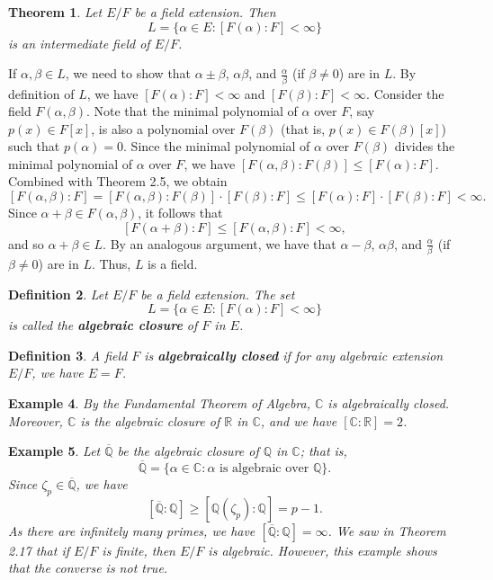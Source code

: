 \documentclass[10pt]{article}
\makeatletter
\newcommand{\R}{\mathbb{R}}
\newcommand{\C}{\mathbb{C}}
\newcommand{\Q}{\mathbb{Q}}
\theoremstyle{newstyle}
\newtheorem{thm}{Theorem}[section]
\newtheorem{defn}[thm]{Definition}
\newtheorem{exmp}[thm]{Example}
\newenvironment{pf}[1][\proofname]{\par
  \pushQED{\qed}%
  \normalfont \topsep0\p@\relax
  \trivlist
  \item[\hskip\labelsep\scshape
  #1\@addpunct{.}]\ignorespaces
}{%
  \popQED\endtrivlist\@endpefalse
}
\makeatother
\begin{document}
\begin{thm}
Let $E/F$ be a field extension. Then 
\[ L = \{\alpha \in E : [F(\alpha) : F] < \infty\} \] 
is an intermediate field of $E/F$.
\end{thm}
\begin{pf}
If $\alpha, \beta \in L$, we need to show that $\alpha \pm \beta$, $\alpha\beta$, and 
$\frac\alpha\beta$ (if $\beta \neq 0$) are in $L$. By definition of $L$, we have 
$[F(\alpha) : F] < \infty$ and $[F(\beta) : F] < \infty$. Consider the field $F(\alpha, \beta)$. 
Note that the minimal polynomial of $\alpha$ over $F$, say $p(x) \in F[x]$, is 
also a polynomial over $F(\beta)$ (that is, $p(x) \in F(\beta)[x]$) such that 
$p(\alpha) = 0$. 
Since the minimal polynomial of $\alpha$ over $F(\beta)$ divides the minimal polynomial 
of $\alpha$ over $F$, we have $[F(\alpha, \beta) : F(\beta)] \leq [F(\alpha) : F]$. 
Combined with Theorem 2.5, we obtain 
\[ [F(\alpha, \beta) : F] = [F(\alpha, \beta) : F(\beta)] \cdot [F(\beta) : F] \leq 
[F(\alpha) : F] \cdot [F(\beta) : F] < \infty. \] 
Since $\alpha + \beta \in F(\alpha, \beta)$, it follows that
\[ [F(\alpha + \beta) : F] \leq [F(\alpha, \beta) : F] < \infty, \]
and so $\alpha + \beta \in L$. By an analogous argument, we have that 
$\alpha-\beta$, $\alpha\beta$, and $\frac\alpha\beta$ (if $\beta\neq0$) are in $L$. 
Thus, $L$ is a field.
\end{pf}

\begin{defn}
Let $E/F$ be a field extension. The set 
\[ L = \{\alpha \in E : [F(\alpha) : F] < \infty\} \] 
is called the {\bf algebraic closure} of $F$ in $E$.
\end{defn}

\begin{defn}
A field $F$ is {\bf algebraically closed} if for any algebraic extension $E/F$, we have $E = F$.
\end{defn}

\begin{exmp}
By the Fundamental Theorem of Algebra, $\C$ is algebraically closed. Moreover, $\C$ is 
the algebraic closure of $\R$ in $\C$, and we have $[\C : \R] = 2$.
\end{exmp}

\begin{exmp}
Let $\overline{\Q}$ be the algebraic closure of $\Q$ in $\C$; that is, 
\[ \overline{\Q} = \{\alpha \in \C : \alpha \text{ is algebraic over $\Q$}\}. \]
Since $\zeta_p \in \overline{\Q}$, we have 
\[ [\overline{\Q} : \Q] \geq [\Q(\zeta_p) : \Q] = p-1. \]
As there are infinitely many primes, we have $[\overline{\Q} : \Q] = \infty$. We saw in Theorem 
2.17 that if $E/F$ is finite, then $E/F$ is algebraic. However, this example shows that the 
converse is not true.
\end{exmp}
\end{document}
